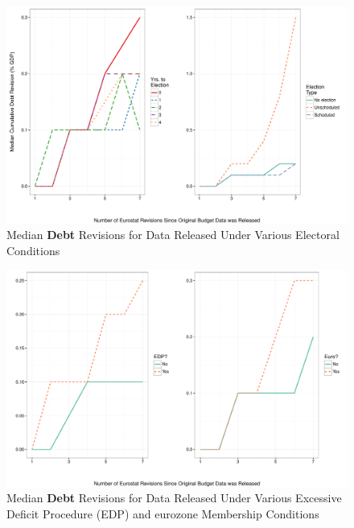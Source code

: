 \documentclass[]{article}
\begin{document}
\begin{figure}
    \begin{center}
        \caption{Median \textbf{Debt} Revisions for Data Released Under Various Electoral Conditions}
        \label{median_debt_revisions}
        \includegraphics[scale=0.55]{figures/median_debt_revisions.pdf}
    \end{center}
\end{figure}

\begin{figure}
    \begin{center}
        \caption{Median \textbf{Debt} Revisions for Data Released Under Various Excessive Deficit Procedure (EDP) and eurozone Membership Conditions}
        \label{median_debt_revisions_edp_eu}
        \includegraphics[scale=0.55]{figures/median_debt_revisions_edp_euro.pdf}
    \end{center}
\end{figure}
\end{document}
